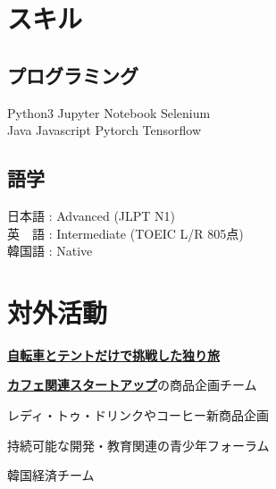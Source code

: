\documentclass[]{deedy-resume-openfont}
\begin{document}
\begin{minipage}[t]{0.44\textwidth}

\section{スキル}
\subsection{プログラミング}
Python3 \textbullet{} Jupyter Notebook \textbullet{} Selenium \textbullet{} \\Java \textbullet{} Javascript \textbullet{} Pytorch  \textbullet{} Tensorflow \\
\sectionsep

\subsection{語学}
日本語 : Advanced (JLPT N1)\\
英　語 : Intermediate (TOEIC L/R 805点)\\
韓国語 : Native
\sectionsep

\section{対外活動}

\vspace{\topsep}
\begin{tightemize}
\item \textbf{\href{https://nhandsome.github.io/daily/2020/09/17/daily-bicycle-INTRO/}{自転車とテントだけで挑戦した独り旅}}
\end{tightemize}
\sectionsep


\begin{tightemize}
\item \textbf{\href{https://handium.co.kr/}{カフェ関連スタートアップ}}の商品企画チーム
\item レディ・トゥ・ドリンクやコーヒー新商品企画
\end{tightemize}
\sectionsep


\begin{tightemize}
\item 持続可能な開発・教育関連の青少年フォーラム
\item 韓国経済チーム
\end{tightemize}
\sectionsep



\end{minipage}
\end{document}
